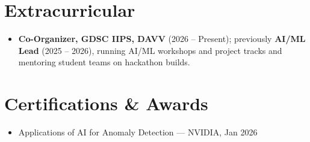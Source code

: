 \documentclass[10pt,letterpaper]{article}
\begin{document}
\section*{Extracurricular}
\begin{itemize}
  \item \textbf{Co-Organizer, GDSC IIPS, DAVV} (2026 -- Present); previously \textbf{AI/ML Lead} (2025 -- 2026), running AI/ML workshops and
  project tracks and mentoring student teams on hackathon builds.
\end{itemize}

\section*{Certifications \& Awards}
\begin{itemize}
  \item Applications of AI for Anomaly Detection --- NVIDIA, Jan 2026
\end{itemize}
\end{document}
